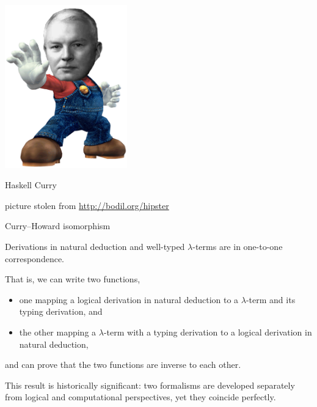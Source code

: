 \documentclass[t,compress,hyperref={hidelinks}]{beamer}
\begin{document}
\begin{frame}

\begin{center}

\vspace*{\fill}

\includegraphics[height=200pt]{curry-mario.png}

\color{OxfordOlive}\LARGE Haskell Curry

\vspace*{\fill}

\tiny\color{gray} picture stolen from \url{http://bodil.org/hipster}

\end{center}

\end{frame}

\begin{frame}{Curry--Howard isomorphism}

Derivations in natural deduction and well-typed $\lambda$-terms are in one-to-one correspondence.

That is, we can write two functions,
\begin{itemize}
\item one mapping a logical derivation in natural deduction to a $\lambda$-term and its typing derivation, and
\item the other mapping a $\lambda$-term with a typing derivation to a logical derivation in natural deduction,
\end{itemize}
and can prove that the two functions are inverse to each other.

This result is historically significant: two formalisms are developed separately from logical and computational perspectives, yet they coincide perfectly.

\end{frame}
\end{document}

